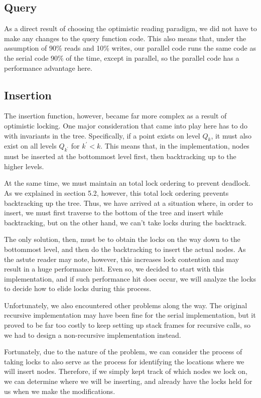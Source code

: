 \documentclass[10pt]{article}
\begin{document}
\subsection{Query}
As a direct result of choosing the optimistic reading paradigm, we did not have to make any changes to the query function code. This also means that, under the assumption of 90\% reads and 10\% writes, our parallel code runs the same code as the serial code 90\% of the time, except in parallel, so the parallel code has a performance advantage here.

\subsection{Insertion}
The insertion function, however, became far more complex as a result of optimistic locking. One major consideration that came into play here has to do with invariants in the tree. Specifically, if a point exists on level $Q_k$, it must also exist on all levels $Q_{k^\prime}$ for $k^\prime < k$. This means that, in the implementation, nodes must be inserted at the bottommost level first, then backtracking up to the higher levels.

At the same time, we must maintain an total lock ordering to prevent deadlock. As we explained in section 5.2, however, this total lock ordering prevents backtracking up the tree. Thus, we have arrived at a situation where, in order to insert, we must first traverse to the bottom of the tree and insert while backtracking, but on the other hand, we can't take locks during the backtrack.

The only solution, then, must be to obtain the locks on the way down to the bottommost level, and then do the backtracking to insert the actual nodes. As the astute reader may note, however, this increases lock contention and may result in a huge performance hit. Even so, we decided to start with this implementation, and if such performance hit does occur, we will analyze the locks to decide how to elide locks during this process.

Unfortunately, we also encountered other problems along the way. The original recursive implementation may have been fine for the serial implementation, but it proved to be far too costly to keep setting up stack frames for recursive calls, so we had to design a non-recursive implementation instead.

Fortunately, due to the nature of the problem, we can consider the process of taking locks to also serve as the process for identifying the locations where we will insert nodes. Therefore, if we simply kept track of which nodes we lock on, we can determine where we will be inserting, and already have the locks held for us when we make the modifications.
\end{document}
